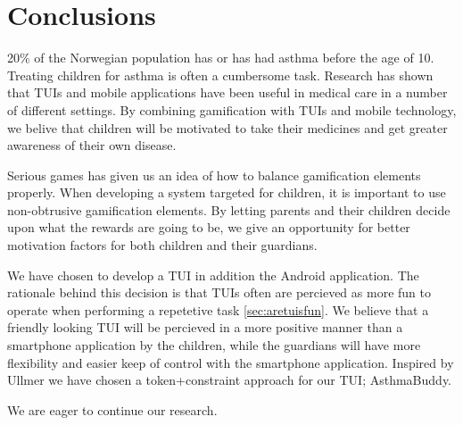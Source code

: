 \chapter{Conclusions}
\label{conclusions}

20\% of the Norwegian population has or has had asthma before the age of 10. Treating children for asthma is often a cumbersome task. Research has shown that TUIs and mobile applications have been useful in medical care in a number of different settings. By combining gamification with TUIs and mobile technology, we belive that children will be motivated to take their medicines and get greater awareness of their own disease.    


Serious games has given us an idea of how to balance gamification elements properly. When developing a system targeted for children, it is important to use non-obtrusive gamification elements. By letting parents and their children decide upon what the rewards are going to be, we give an opportunity for better motivation factors for both children and their guardians.   


We have chosen to develop a TUI in addition the Android application. The rationale behind this decision is that TUIs often are percieved as more fun to operate when performing a repetetive task \ref{sec:aretuisfun}. We believe that a friendly looking TUI will be percieved in a more positive manner than a smartphone application by the children, while the guardians will have more flexibility and easier keep of control with the smartphone application. Inspired by Ullmer \cite{ullmer2002tangible} we have chosen a token+constraint approach for our TUI; AsthmaBuddy.

We are eager to continue our research.


